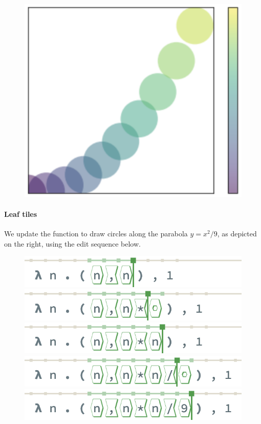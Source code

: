 \setlength\intextsep{0pt}
\begin{figure}
  \centering
  \hspace*{-0.07\columnwidth}
  \includegraphics[width=0.15\columnwidth]{img/circles-parabola.png}
\end{figure}

\paragraph{Leaf tiles}
We update the function to
draw circles along the parabola $y = x^2/9$,
as depicted on the right,
using the edit sequence below.

\begin{figure}[h]
  \centering
  \includegraphics[width=0.7\columnwidth]{img/linear-insertion-0.png}
  \includegraphics[width=0.7\columnwidth]{img/linear-insertion-1.png}
  \includegraphics[width=0.7\columnwidth]{img/linear-insertion-2.png}
  \includegraphics[width=0.7\columnwidth]{img/linear-insertion-3.png}
  \includegraphics[width=0.7\columnwidth]{img/linear-insertion-4.png}
\end{figure}

